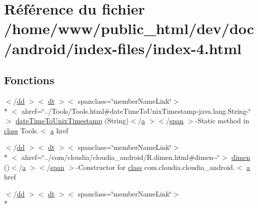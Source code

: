 \hypertarget{index-4_8html}{\section{Référence du fichier /home/www/public\-\_\-html/dev/doc/android/index-\/files/index-\/4.html}
\label{index-4_8html}
}
\subsection*{Fonctions}
\begin{DoxyCompactItemize}
\item 
$<$/\hyperlink{stylesheet_8css_a47f4718a86835a7771ec592ece845221}{dd} $>$$<$ \hyperlink{stylesheet_8css_a107565fb4039d33b041380d6e0ea1d80}{dt} $>$$<$ spanclass=\char`\"{}member\-Name\-Link\char`\"{}$>$\\*
$<$ ahref=\char`\"{}../Tools/Tools.\-html\#date\-Time\-To\-Unix\-Timestamp-\/java.\-lang.\-String-\/\char`\"{}$>$ \hyperlink{index-4_8html_a0167cf20d76dfd16d66e0cda4cb9743c}{date\-Time\-To\-Unix\-Timestamp} (String)$<$/\hyperlink{style_8css_a5e8981582017bb8b84c21f148345d1f7}{a} $>$$<$/\hyperlink{stylesheet_8css_a8343996ebcf16220b04e54659aac31cc}{span} $>$-\/Static method in \hyperlink{_tools_8html_acf06f836132665ba8114f5a414c2403f}{class} Tools.$<$ \hyperlink{style_8css_a5e8981582017bb8b84c21f148345d1f7}{a} href
\item 
$<$/\hyperlink{stylesheet_8css_a47f4718a86835a7771ec592ece845221}{dd} $>$$<$ \hyperlink{stylesheet_8css_a107565fb4039d33b041380d6e0ea1d80}{dt} $>$$<$ spanclass=\char`\"{}member\-Name\-Link\char`\"{}$>$\\*
$<$ ahref=\char`\"{}../com/cloudia/cloudia\-\_\-android/R.\-dimen.\-html\#dimen-\/-\/\char`\"{}$>$ \hyperlink{index-4_8html_a788baa6fefe82077db8777df522abe04}{dimen} ()$<$/\hyperlink{style_8css_a5e8981582017bb8b84c21f148345d1f7}{a} $>$$<$/\hyperlink{stylesheet_8css_a8343996ebcf16220b04e54659aac31cc}{span} $>$-\/Constructor for \hyperlink{_tools_8html_acf06f836132665ba8114f5a414c2403f}{class} com.\-cloudia.\-cloudia\-\_\-android.$<$ \hyperlink{style_8css_a5e8981582017bb8b84c21f148345d1f7}{a} href
\item 
$<$/\hyperlink{stylesheet_8css_a47f4718a86835a7771ec592ece845221}{dd} $>$$<$ \hyperlink{stylesheet_8css_a107565fb4039d33b041380d6e0ea1d80}{dt} $>$$<$ spanclass=\char`\"{}member\-Name\-Link\char`\"{}$>$\\*

\end{DoxyCompactItemize}
